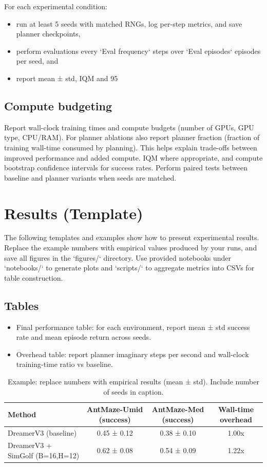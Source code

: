 \documentclass{article}
\begin{document}
For each experimental condition:
\begin{itemize}
\item run at least 5 seeds with matched RNGs, log per-step metrics, and save planner checkpoints,
\item perform evaluations every `Eval frequency` steps over `Eval episodes` episodes per seed, and
\item report mean ± std, IQM and 95%
\end{itemize}

\subsection{Compute budgeting}
Report wall-clock training times and compute budgets (number of GPUs, GPU type,
CPU/RAM). For planner ablations also report planner fraction (fraction of
training wall-time consumed by planning). This helps explain trade-offs between
improved performance and added compute.
IQM where appropriate, and compute bootstrap confidence intervals for success
rates. Perform paired tests between baseline and planner variants when seeds
are matched.

\section{Results (Template)}
\label{sec:results}
The following templates and examples show how to present experimental results. Replace the example numbers with empirical values produced by your runs, and save all figures in the `figures/` directory. Use provided notebooks under `notebooks/` to generate plots and `scripts/` to aggregate metrics into CSVs for table construction.

\subsection{Tables}
\begin{itemize}
\item Final performance table: for each environment, report mean ± std success rate and mean episode return across seeds.
\item Overhead table: report planner imaginary steps per second and wall-clock training-time ratio vs baseline.
\end{itemize}

\begin{table}[ht]
\centering
\begin{tabular}{lccc}
\toprule
Method & AntMaze-Umid (success) & AntMaze-Med (success) & Wall-time overhead \\
\midrule
DreamerV3 (baseline) & 0.45 ± 0.12 & 0.38 ± 0.10 & 1.00x \\
DreamerV3 + SimGolf (B=16,H=12) & 0.62 ± 0.08 & 0.54 ± 0.09 & 1.22x \\
\bottomrule
\end{tabular}
\caption{Example: replace numbers with empirical results (mean ± std). Include number of seeds in caption.}
\end{table}
\end{document}
